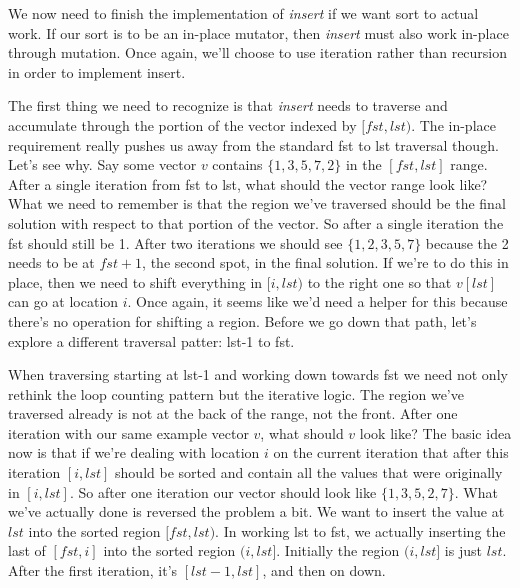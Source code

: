 \documentclass[]{tufte-handout}
\begin{document}
We now need to finish the implementation of \textit{insert} if we want sort to actual work. If our sort is to be an in-place mutator, then \textit{insert} must also work in-place through mutation. Once again, we'll choose to use iteration rather than recursion in order to implement insert.

The first thing we need to recognize is that \textit{insert} needs to traverse and accumulate through the portion of the vector indexed by $[fst,lst)$. The in-place requirement really pushes us away from the standard fst to lst traversal though. Let's see why. Say some vector $v$ contains $\{1,3,5,7,2\}$ in the $[fst,lst]$ range. After a single iteration from fst to lst, what should the vector range look like? What we need to remember is that the region we've traversed should be the final solution with respect to that portion of the vector. So after a single iteration the fst should still be 1. After two iterations we should see $\{1,2,3,5,7\}$ because the 2 needs to be at $fst+1$, the second spot, in the final solution. If we're to do this in place, then we need to shift everything in $[i,lst)$ to the right one so that $v[lst]$ can go at location $i$.  Once again, it seems like we'd need a helper for this because there's no operation for shifting a region. Before we go down that path, let's explore a different traversal patter: lst-1 to fst.

When traversing starting at lst-1 and working down towards fst we need not only rethink the loop counting pattern but the iterative logic. The region we've traversed already is not at the back of the range, not the front. After one iteration with our same example vector $v$, what should $v$ look like? The basic idea now is that if we're dealing with location $i$ on the current iteration that after this iteration $[i,lst]$ should be sorted and contain all the values that were originally in $[i,lst]$. So after one iteration our vector should look like $\{1,3,5,2,7\}$. What we've actually done is reversed the problem a bit. We want to insert the value at $lst$ into the sorted region $[fst,lst)$.  In working lst to fst, we actually inserting the last of $[fst,i]$ into the sorted region $(i,lst]$. Initially the region $(i,lst]$ is just $lst$. After the first iteration, it's $[lst-1,lst]$, and then on down.
\end{document}
